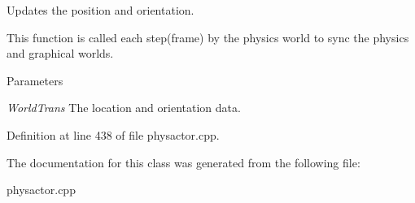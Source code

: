 Updates the position and orientation. 

This function is called each step(frame) by the physics world to sync the physics and graphical worlds. 
\begin{DoxyParams}{Parameters}
\item[{\em WorldTrans}]The location and orientation data. \end{DoxyParams}


Definition at line 438 of file physactor.cpp.



The documentation for this class was generated from the following file:\begin{DoxyCompactItemize}
\item 
physactor.cpp\end{DoxyCompactItemize}
